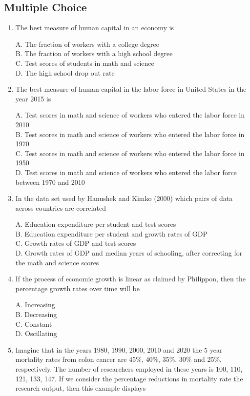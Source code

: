 \documentclass[
]{book}
\begin{document}
\hypertarget{multiple-choice-2}{%
\subsection{Multiple Choice}\label{multiple-choice-2}}

\begin{enumerate}
\def\labelenumi{\arabic{enumi}.}
\item
  The best measure of human capital in an economy is

  A. The fraction of workers with a college degree\\
  B. The fraction of workers with a high school degree\\
  C. Test scores of students in math and science\\
  D. The high school drop out rate
\item
  The best measure of human capital in the labor force in United States in the year 2015 is

  A. Test scores in math and science of workers who entered the labor force in 2010\\
  B. Test scores in math and science of workers who entered the labor force in 1970\\
  C. Test scores in math and science of workers who entered the labor force in 1950\\
  D. Test scores in math and science of workers who entered the labor force between 1970 and 2010
\item
  In the data set used by Hanushek and Kimko (2000) which pairs of data across countries are correlated

  A. Education expenditure per student and test scores\\
  B. Education expenditure per student and growth rates of GDP\\
  C. Growth rates of GDP and test scores\\
  D. Growth rates of GDP and median years of schooling, after correcting for the math and science scores
\item
  If the process of economic growth is linear as claimed by Philippon, then the percentage growth rates over time will be

  A. Increasing\\
  B. Decreasing\\
  C. Constant\\
  D. Oscillating
\item
  Imagine that in the years 1980, 1990, 2000, 2010 and 2020 the 5 year mortality rates from colon cancer are 45\%, 40\%, 35\%, 30\% and 25\%, respectively. The number of researchers employed in these years is 100, 110, 121, 133, 147. If we consider the percentage reductions in mortality rate the research output, then this example displays


\end{enumerate}
\end{document}
